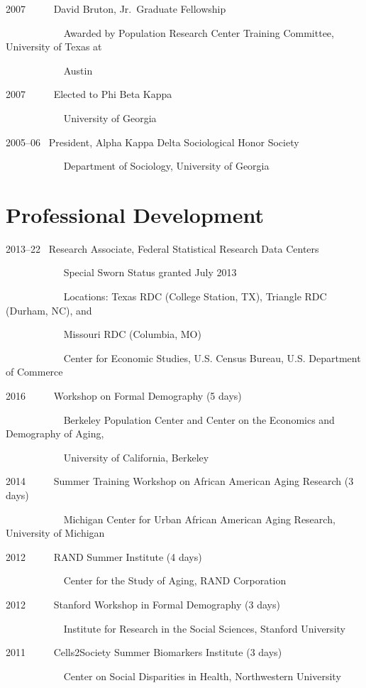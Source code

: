 \documentclass[11pt,]{article}
\begin{document}
2007 ~ ~ ~ David Bruton, Jr.~Graduate Fellowship\\
\strut ~ ~ ~ ~ ~ ~ ~ Awarded by Population Research Center Training
Committee, University of Texas at\\
\strut ~ ~ ~ ~ ~ ~ ~ Austin

2007 ~ ~ ~ Elected to Phi Beta Kappa\\
\strut ~ ~ ~ ~ ~ ~ ~ University of Georgia

2005--06 ~President, Alpha Kappa Delta Sociological Honor Society\\
\strut ~ ~ ~ ~ ~ ~ ~ Department of Sociology, University of Georgia

\section{Professional Development}\label{professional-development}

2013--22 ~Research Associate, Federal Statistical Research Data
Centers\\
\strut ~ ~ ~ ~ ~ ~ ~ Special Sworn Status granted July 2013\\
\strut ~ ~ ~ ~ ~ ~ ~ Locations: Texas RDC (College Station, TX),
Triangle RDC (Durham, NC), and\\
\strut ~ ~ ~ ~ ~ ~ ~ Missouri RDC (Columbia, MO)\\
\strut ~ ~ ~ ~ ~ ~ ~ Center for Economic Studies, U.S. Census Bureau,
U.S. Department of Commerce

2016 ~ ~ ~ Workshop on Formal Demography (5 days)\\
\strut ~ ~ ~ ~ ~ ~ ~ Berkeley Population Center and Center on the
Economics and Demography of Aging,\\
\strut ~ ~ ~ ~ ~ ~ ~ University of California, Berkeley

2014 ~ ~ ~ Summer Training Workshop on African American Aging Research
(3 days)\\
\strut ~ ~ ~ ~ ~ ~ ~ Michigan Center for Urban African American Aging
Research, University of Michigan

2012 ~ ~ ~ RAND Summer Institute (4 days)\\
\strut ~ ~ ~ ~ ~ ~ ~ Center for the Study of Aging, RAND Corporation

2012 ~ ~ ~ Stanford Workshop in Formal Demography (3 days)\\
\strut ~ ~ ~ ~ ~ ~ ~ Institute for Research in the Social Sciences,
Stanford University

2011 ~ ~ ~ Cells2Society Summer Biomarkers Institute (3 days)\\
\strut ~ ~ ~ ~ ~ ~ ~ Center on Social Disparities in Health,
Northwestern University
\end{document}
